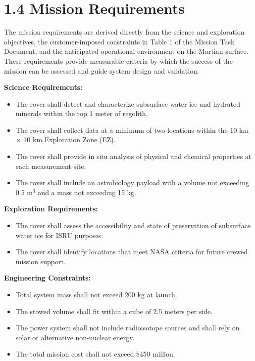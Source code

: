 \section*{1.4 Mission Requirements}

The mission requirements are derived directly from the science and exploration objectives, the customer-imposed constraints in Table 1 of the Mission Task Document, and the anticipated operational environment on the Martian surface. These requirements provide measurable criteria by which the success of the mission can be assessed and guide system design and validation.

\textbf{Science Requirements:}
\begin{itemize}
    \item The rover shall detect and characterize subsurface water ice and hydrated minerals within the top 1 meter of regolith.
    \item The rover shall collect data at a minimum of two locations within the 10 km $\times$ 10 km Exploration Zone (EZ).
    \item The rover shall provide in situ analysis of physical and chemical properties at each measurement site.
    \item The rover shall include an astrobiology payload with a volume not exceeding 0.5 m$^3$ and a mass not exceeding 15 kg.
\end{itemize}

\textbf{Exploration Requirements:}
\begin{itemize}
    \item The rover shall assess the accessibility and state of preservation of subsurface water ice for ISRU purposes.
    \item The rover shall identify locations that meet NASA criteria for future crewed mission support.
\end{itemize}

\textbf{Engineering Constraints:}
\begin{itemize}
    \item Total system mass shall not exceed 200 kg at launch.
    \item The stowed volume shall fit within a cube of 2.5 meters per side.
    \item The power system shall not include radioisotope sources and shall rely on solar or alternative non-nuclear energy.
    \item The total mission cost shall not exceed \$450 million.
\end{itemize}

